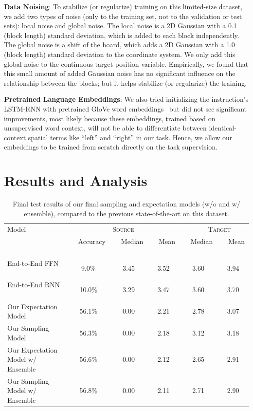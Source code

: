 \documentclass[letterpaper]{article} %
\begin{document}
\textbf{Data Noising}: To stabilize (or regularize) training on this limited-size dataset, we add two types of noise (only to the training set, not to the validation or test sets): local noise and global noise. The local noise is a 2D Gaussian with a 0.1 (block length) standard deviation, which is added to each block independently. The global noise is a shift of the board, which adds a 2D Gaussian with a 1.0 (block length) standard deviation to the coordinate system. We only add this global noise to the continuous target position variable. Empirically, we found that this small amount of added Gaussian noise has no significant influence on the relationship between the blocks;
but it helps stabilize (or regularize) the training.

\textbf{Pretrained Language Embeddings}: We also tried initializing the instruction's LSTM-RNN with pretrained GloVe word embeddings~\cite{pennington2014glove} but did not see significant improvements, most likely because these embeddings, trained based on unsupervised word context, will not be able to differentiate between identical-context spatial terms like ``left'' and ``right'' in our task. Hence, we allow our embeddings to be trained from scratch directly on the task supervision.

\section{Results and Analysis}



\begin{table}[ht!]
\begin{center}
\begin{tabular}{|l|ccc|cc|}
\hline
\multirow{1}{*}{Model} & \multicolumn{3}{c|}{\textsc{Source}} & \multicolumn{2}{c|}{\textsc{ \ \ \ Target}} \\
&  \ \ Accuracy \ \  & \ \  Median \ \  &  \ \ Mean  \ \  & \ \  Median \ \  &  \ \ Mean \ \  \\
\hline
\hline
End-to-End FFN ~\cite{bisk2016natural}
& 9.0\% & 3.45 & 3.52 & 3.60 & 3.94
\\
End-to-End RNN ~\cite{bisk2016natural} \ \ \ 			&	10.0\%	&	3.29	&	3.47	&	3.60	&	3.70	\\
\hline
\hline
Our Expectation Model \ \ \ 		&	56.1\% &	0.00	&	2.21	&	2.78	&	3.07	\\
Our Sampling Model \ \ \ 		&	56.3\% &	0.00	&	2.18 	&	3.12	&	3.18	\\
\hline
\hline
Our Expectation Model w/ Ensemble \ \ \ 		&	56.6\%	&	0.00	&	2.12	&	2.65	&	2.91	\\
Our Sampling Model w/ Ensemble\ \ \ 		&	56.8\%&	0.00	&	2.11 	&	2.71	&	2.90	\\
\hline
\end{tabular}
\end{center}
\caption{Final test results of our final sampling and expectation models (w/o and w/ ensemble), compared to the previous state-of-the-art on this dataset.}
\label{table:test_result}
\end{table}
\end{document}
